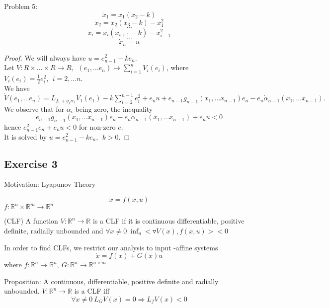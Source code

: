     Problem 5:
    $$\dot x_1 = x_1(x_2-k)$$
    $$\dot x_2 = x_2(x_3-k)-x_1^2$$
    $$\dots$$
    $$\dot x_i = x_i(x_{i+1}-k)-x_{i-1}^2$$
    $$\dots$$
    $$\dot x_n = u$$
    \begin{proof}
        We will always have $u = e_{n-1}^2-ke_n$. \\
        Let $V: R \times \dots \times R \rightarrow R, \ \ (e_1, \dots e_n) \mapsto \sum_{i=1}^n V_i(e_i)$, where $V_i(e_i) = \frac{1}{2}e_i^2, \ \ i=2, \dots n$.\\
        We have $\dot V(e_1, \dots e_n) = L_{f_1+g_1\alpha_1}V_1(e_1)-k\sum_{i=2}^{n-1}e_i^2 + e_nu + e_{n-1}g_{n-1}(x_1, \dots x_{n-1})e_n - e_n \dot \alpha_{n-1}(x_1, \dots x_{n-1}).$\\
        We observe that for $\alpha_i$ being zero, the inequality
        $$e_{n-1}g_{n-1}(x_1, \dots x_{n-1})e_n - e_n \dot \alpha_{n-1} (x_1, \dots x_{n-1}) + e_nu < 0$$
        hence $e_{n-1}^2e_n + e_nu < 0$ for non-zero $e$.\\
        It is solved by $u = e_{n-1}^2 - ke_n, \ \ k>0$.
    \end{proof}
    

\subsection{Exercise 3}

Motivation: Lyapunov Theory

\begin{equation*}
\dot{x} = f(x,u)
\end{equation*}
$f:\mathbb{R}^n \times \mathbb{R}^m \to \mathbb{R}^n$

\begin{Definition}
(CLF) A function $V: \mathbb{R}^n \to \mathbb{R}$ is a CLF if it is continuous differentiable, positive definite, radially unbounded and $ \forall x \neq 0 \ \inf_{u}< \triangledown V(x), f(x,u) > < 0$ 
\end{Definition}

In order to find CLFs, we restrict our analysis to input -affine systems
\begin{equation*}
\dot{x} = f(x) + G(x)u
\end{equation*}
where $f: \mathbb{R}^n \to \mathbb{R}^n, \ G: \mathbb{R}^n \to \mathbb{R}^{n \times m}$

Proposition: A continuous, differentiable, positive definite and radially unbounded. $V: \mathbb{R}^n \to \mathbb{R}$ is a CLF iff 
\begin{equation*}
\forall x \neq 0 \ L_GV(x) = 0 \Rightarrow L_fV(x) < 0
\end{equation*}

